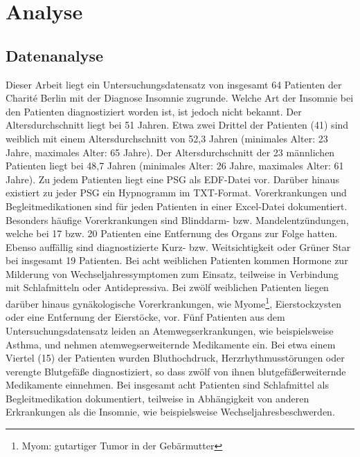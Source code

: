 \chapter{Analyse}

\section{Datenanalyse}

Dieser Arbeit liegt ein Untersuchungsdatensatz von insgesamt 64 Patienten der Charit\'{e} Berlin mit der Diagnose Insomnie zugrunde. Welche Art der Insomnie bei den Patienten diagnostiziert worden ist, ist jedoch nicht bekannt. Der Altersdurchschnitt liegt bei 51 Jahren. Etwa zwei Drittel der Patienten (41) sind weiblich mit einem Altersdurchschnitt von 52,3 Jahren (minimales Alter: 23 Jahre, maximales Alter: 65 Jahre). Der Altersdurchschnitt der 23 männlichen Patienten liegt bei 48,7 Jahren (minimales Alter: 26 Jahre, maximales Alter: 61 Jahre). Zu jedem Patienten liegt eine \acs{PSG} als \acs{EDF}-Datei vor. Darüber hinaus existiert zu jeder \acs{PSG} ein Hypnogramm im TXT-Format. Vorerkrankungen und Begleitmedikationen sind für jeden Patienten in einer Excel-Datei dokumentiert.\\

Besonders häufige Vorerkrankungen sind Blinddarm- bzw. Mandelentzündungen, welche bei 17 bzw. 20 Patienten eine Entfernung des Organs zur Folge hatten. Ebenso auffällig sind diagnostizierte Kurz- bzw. Weitsichtigkeit oder Grüner Star bei insgesamt 19 Patienten. Bei acht weiblichen Patienten kommen Hormone zur Milderung von Wechseljahressymptomen zum Einsatz, teilweise in Verbindung mit Schlafmitteln oder Antidepressiva. Bei zwölf weiblichen Patienten liegen darüber hinaus gynäkologische Vorerkrankungen, wie Myome\footnote{Myom: gutartiger Tumor in der Gebärmutter}, Eierstockzysten oder eine Entfernung der Eierstöcke, vor. Fünf Patienten aus dem Untersuchungsdatensatz leiden an Atemwegserkrankungen, wie beispielsweise Asthma, und nehmen atemwegserweiternde Medikamente ein. Bei etwa einem Viertel (15) der Patienten wurden Bluthochdruck, Herzrhythmusstörungen oder verengte Blutgefäße diagnostiziert, so dass zwölf von ihnen blutgefäßerweiternde Medikamente einnehmen. Bei insgesamt acht Patienten sind Schlafmittel als Begleitmedikation dokumentiert, teilweise in Abhängigkeit von anderen Erkrankungen als die Insomnie, wie beispielsweise Wechseljahresbeschwerden.\\

